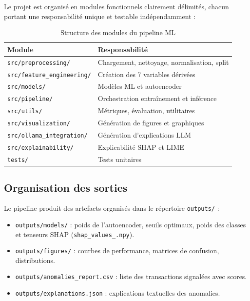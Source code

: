 \documentclass[12pt,a4paper,twoside]{report}
\begin{document}
Le projet est organisé en modules fonctionnels clairement délimités, chacun portant une responsabilité unique et testable indépendamment :

\begin{table}[H]
\centering
\caption{Structure des modules du pipeline ML}
\label{tab:modules}
\begin{tabular}{ll}
\toprule
\textbf{Module} & \textbf{Responsabilité} \\
\midrule
\texttt{src/preprocessing/}       & Chargement, nettoyage, normalisation, split \\
\texttt{src/feature\_engineering/} & Création des 7 variables dérivées \\
\texttt{src/models/}              & Modèles ML et autoencoder \\
\texttt{src/pipeline/}            & Orchestration entraînement et inférence \\
\texttt{src/utils/}               & Métriques, évaluation, utilitaires \\
\texttt{src/visualization/}       & Génération de figures et graphiques \\
\texttt{src/ollama\_integration/} & Génération d'explications LLM \\
\texttt{src/explainability/}      & Explicabilité SHAP et LIME \\
\texttt{tests/}                   & Tests unitaires \\
\bottomrule
\end{tabular}
\end{table}

\subsection{Organisation des sorties}

Le pipeline produit des artefacts organisés dans le répertoire \texttt{outputs/} :
\begin{itemize}
  \item \texttt{outputs/models/} : poids de l'autoencoder, seuils optimaux, poids des classes et tenseurs SHAP (\texttt{shap\_values\_\*.npy}).
  \item \texttt{outputs/figures/} : courbes de performance, matrices de confusion, distributions.
  \item \texttt{outputs/anomalies\_report.csv} : liste des transactions signalées avec scores.
  \item \texttt{outputs/explanations.json} : explications textuelles des anomalies.
\end{itemize}
\end{document}
